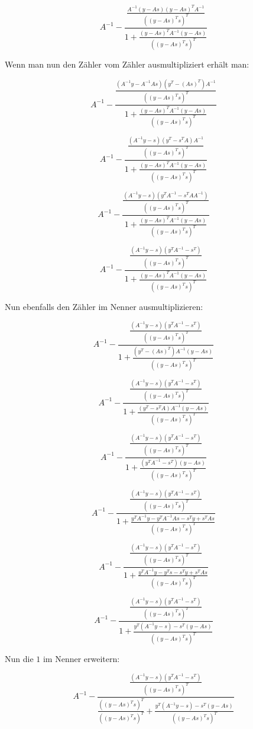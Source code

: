 \documentclass[a4paper, 12pt]{report}
\begin{document}
$$ A^{-1} - \frac{ \frac{A^{-1}(y-As)(y-As)^TA^{-1}}{\left( (y-As)^Ts\right)^T } }{1 + \frac{(y-As)^TA^{-1}(y-As)}{\left( (y-As)^Ts\right)^T}}$$

Wenn man nun den Zähler vom Zähler ausmultipliziert erhält man:

$$ A^{-1} - \frac{ \frac{ (A^{-1}y - A^{-1}As)(y^T-(As)^T)A^{-1} }{\left( (y-As)^Ts\right)^T } }{1 + \frac{(y-As)^TA^{-1}(y-As)}{\left( (y-As)^Ts\right)^T}}$$

$$ A^{-1} - \frac{ \frac{ (A^{-1}y - s)(y^T - s^TA)A^{-1} }{\left( (y-As)^Ts\right)^T } }{1 + \frac{(y-As)^TA^{-1}(y-As)}{\left( (y-As)^Ts\right)^T}}$$

$$ A^{-1} - \frac{ \frac{ (A^{-1}y - s)(y^TA^{-1} - s^TAA^{-1}) }{\left( (y-As)^Ts\right)^T } }{1 + \frac{(y-As)^TA^{-1}(y-As)}{\left( (y-As)^Ts\right)^T}}$$

$$ A^{-1} - \frac{ \frac{ (A^{-1}y-s)(y^TA^{-1}-s^T) }{\left( (y-As)^Ts\right)^T } }{1 + \frac{(y-As)^TA^{-1}(y-As)}{\left( (y-As)^Ts\right)^T}}$$

Nun ebenfalls den Zähler im Nenner ausmultiplizieren:

$$ A^{-1} - \frac{ \frac{ (A^{-1}y-s)(y^TA^{-1}-s^T) }{\left( (y-As)^Ts\right)^T } }{1 + \frac{ (y^T - (As)^T)A^{-1}(y - As) }{\left( (y-As)^Ts\right)^T}}$$

$$ A^{-1} - \frac{ \frac{ (A^{-1}y-s)(y^TA^{-1}-s^T) }{\left( (y-As)^Ts\right)^T } }{1 + \frac{ (y^T - s^TA)A^{-1}(y-As) }{\left( (y-As)^Ts\right)^T}}$$

$$ A^{-1} - \frac{ \frac{ (A^{-1}y-s)(y^TA^{-1}-s^T) }{\left( (y-As)^Ts\right)^T } }{1 + \frac{ (y^TA^{-1} - s^T)(y - As) }{\left( (y-As)^Ts\right)^T}}$$

$$ A^{-1} - \frac{ \frac{ (A^{-1}y-s)(y^TA^{-1}-s^T) }{\left( (y-As)^Ts\right)^T } }{1 + \frac{ y^TA^{-1}y - y^TA^{-1}As - s^Ty + s^TAs }{\left( (y-As)^Ts\right)^T}}$$

$$ A^{-1} - \frac{ \frac{ (A^{-1}y-s)(y^TA^{-1}-s^T) }{\left( (y-As)^Ts\right)^T } }{1 + \frac{ y^TA^{-1}y - y^Ts - s^Ty + s^TAs }{\left( (y-As)^Ts\right)^T}}$$

$$ A^{-1} - \frac{ \frac{ (A^{-1}y-s)(y^TA^{-1}-s^T) }{\left( (y-As)^Ts\right)^T } }{1 + \frac{ y^T(A^{-1}y - s) - s^T(y - As) }{\left( (y-As)^Ts\right)^T}}$$

Nun die $1$ im Nenner erweitern:

$$ A^{-1} - \frac{ \frac{ (A^{-1}y-s)(y^TA^{-1}-s^T) }{\left( (y-As)^Ts\right)^T } }{ \frac{\left( (y-As)^Ts\right)^T}{\left( (y-As)^Ts\right)^T} + \frac{ y^T(A^{-1}y - s) - s^T(y - As) }{\left( (y-As)^Ts\right)^T}}$$
\end{document}
